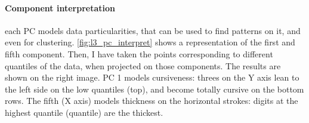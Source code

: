 \documentclass[a4paper, 10pt]{article}
\begin{document}
  \paragraph{Component interpretation} each PC models data particularities, that
  can be used to find patterns on it, and even for clustering. 
  \autoref{fig:l3_pc_interpret} shows a representation of the first and fifth 
  component. Then, I have taken the points corresponding to different quantiles
  of the data, when projected on those components. The results are shown on the
  right image. PC 1 models cursiveness: threes on the Y axis lean to the left
  side on the low quantiles (top), and become totally cursive on the bottom rows.
  The fifth (X axis) models thickness on the horizontal strokes: digits at the 
  highest quantile (quantile) are the thickest.

  
\end{document}
